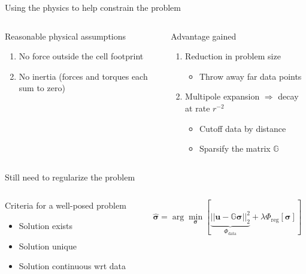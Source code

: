 \documentclass[presentation,aspectratio=169]{beamer}
\newcommand{\bsigma}{\boldsymbol\sigma}
\begin{document}
\begin{frame}{Using the physics to help constrain the problem}
\small
\begin{columns}
\begin{column}{0.4\textwidth}
\begin{block}{Reasonable physical assumptions}
\begin{enumerate}
\item No force outside the cell footprint
\item No inertia (forces and torques each sum to zero)
\end{enumerate}
\end{block}
\end{column}
\begin{column}{0.5\textwidth}
 
\begin{exampleblock}{Advantage gained}
\begin{enumerate} \scriptsize
\item Reduction in problem size
\begin{itemize} \scriptsize
\item Throw away far data points
\end{itemize}
\item Multipole expansion $\Rightarrow$  decay at rate $r^{-2}$
\begin{itemize} \scriptsize
\item Cutoff data by distance
\item Sparsify the matrix $\mathbb{G}$
\end{itemize}
\end{enumerate}
\end{exampleblock}
\end{column}
\end{columns}

\begin{block}{Still need to regularize the problem}

\begin{columns}
\begin{column}{0.4\textwidth}

Criteria for a well-posed problem
\begin{itemize}
\item Solution exists
\item Solution unique
\item Solution continuous wrt data
\end{itemize}
\end{column}
\begin{column}{0.55\textwidth} \Large
\[
\hat{\boldsymbol\sigma} = \arg\min_{\boldsymbol\sigma}\left[ \underbrace{||\mathbf{u} - \mathbb{G}\mathbf{\bsigma}  ||_2^2}_{\Phi_{\textrm{data}}} + \lambda\Phi_{\textrm{reg}}[\boldsymbol\sigma] \right]
\]
\end{column}
\end{columns}

\end{block}

\end{frame}
\end{document}

